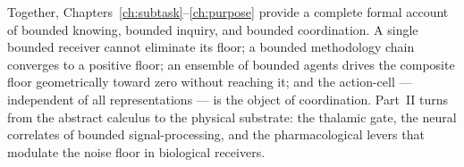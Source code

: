 Together, Chapters~\ref{ch:subtask}--\ref{ch:purpose} provide a complete
formal account of bounded knowing, bounded inquiry, and bounded coordination.
A single bounded receiver cannot eliminate its floor; a bounded methodology
chain converges to a positive floor; an ensemble of bounded agents drives
the composite floor geometrically toward zero without reaching it; and the
action-cell --- independent of all representations --- is the object of
coordination. Part~II turns from the abstract calculus to the physical
substrate: the thalamic gate, the neural correlates of bounded
signal-processing, and the pharmacological levers that modulate the noise
floor in biological receivers.
